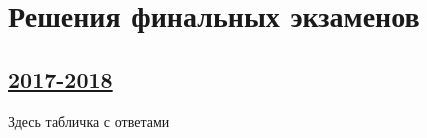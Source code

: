 \thispagestyle{empty}
\section{Решения финальных экзаменов}


\subsection[2017-2018]{\hyperref[sec:final_exam_2017_2018]{2017-2018}}
\label{sec:sol_final_exam_2017_2018}

Здесь табличка с ответами
